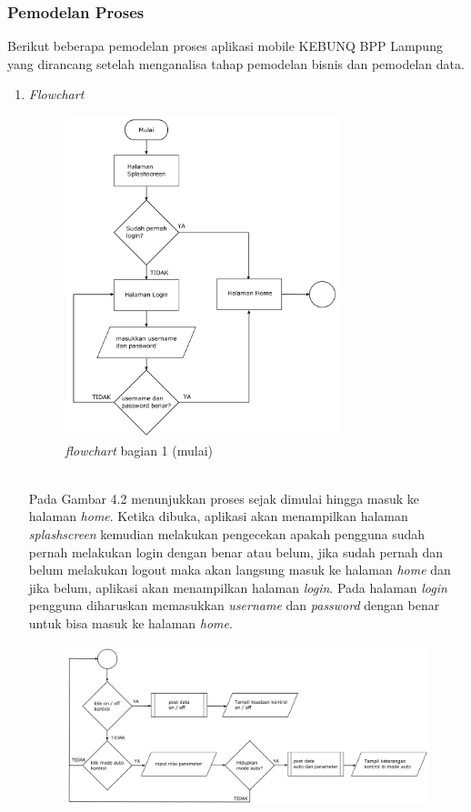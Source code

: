 \begin{flushleft}
\begin{justify}
        \subsubsection{Pemodelan Proses}
        Berikut beberapa pemodelan proses aplikasi mobile KEBUNQ BPP Lampung yang dirancang setelah menganalisa tahap pemodelan bisnis dan 
            pemodelan data.
        \begin{enumerate}[label=\alph*.]
            \item \emph{Flowchart}\\
            \begin{figure}[ht]
                \centering
                \includegraphics[width=8cm]{images/bab 4/fc 1.png}
                \caption{\textit{flowchart} bagian 1 (mulai)}
            \end{figure}
            \\ Pada Gambar 4.2 menunjukkan proses  sejak dimulai hingga masuk ke halaman \emph{home}. Ketika dibuka, aplikasi akan menampilkan halaman \emph{splashscreen} kemudian melakukan pengecekan apakah pengguna sudah pernah
            melakukan login dengan benar atau belum, jika sudah pernah dan belum melakukan logout maka akan langsung masuk ke halaman \emph{home} dan jika belum, aplikasi akan menampilkan halaman \emph{login}. Pada halaman \emph{login} pengguna diharuskan memasukkan \emph{username} dan \emph{password} dengan benar untuk bisa masuk ke halaman \emph{home}.
            \begin{figure}[ht]
                \centering
                \includegraphics[width=12cm]{images/bab 4/fc-kontrol.png}

\end{figure}
\end{enumerate}
\end{justify}
\end{flushleft}
